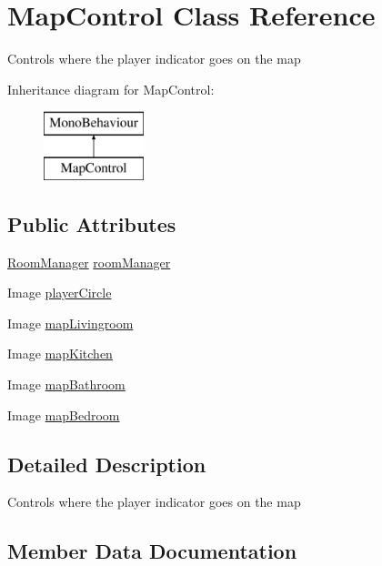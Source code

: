 \hypertarget{class_map_control}{}\section{Map\+Control Class Reference}
\label{class_map_control}


Controls where the player indicator goes on the map  


Inheritance diagram for Map\+Control\+:\begin{figure}[H]
\begin{center}
\leavevmode
\includegraphics[height=2.000000cm]{class_map_control}
\end{center}
\end{figure}
\subsection*{Public Attributes}
\begin{DoxyCompactItemize}
\item 
\hyperlink{class_room_manager}{Room\+Manager} \hyperlink{class_map_control_ab9305dd6451635ad227d129e6f1b21ba}{room\+Manager}
\item 
Image \hyperlink{class_map_control_a9722b307295bb8330c2bc34d0394dda8}{player\+Circle}
\item 
Image \hyperlink{class_map_control_a6129f0815667fe9db2d3bd99f06d63ea}{map\+Livingroom}
\item 
Image \hyperlink{class_map_control_aaa9cdb8794b47acaeb5273f3c8d4237d}{map\+Kitchen}
\item 
Image \hyperlink{class_map_control_ac0357cc26bbd65ce8eeeeef191d83935}{map\+Bathroom}
\item 
Image \hyperlink{class_map_control_aa9e3eab76349fe0045a89716dfb6f43e}{map\+Bedroom}
\end{DoxyCompactItemize}


\subsection{Detailed Description}
Controls where the player indicator goes on the map 



\subsection{Member Data Documentation}
